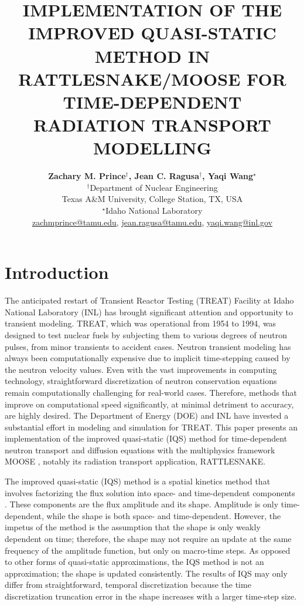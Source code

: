 \documentclass[12pt]{article}
\title{IMPLEMENTATION OF THE IMPROVED QUASI-STATIC METHOD IN RATTLESNAKE/MOOSE FOR TIME-DEPENDENT RADIATION TRANSPORT MODELLING}
\author{ 
  \textbf{Zachary M. Prince$^\dagger$, Jean C. Ragusa$^\dagger$, Yaqi Wang$^\star$} \\
 $^\dagger$Department of Nuclear Engineering \\
  Texas A\&M University, College Station, TX, USA\\
  $^\star$Idaho National Laboratory\\
  \href{mailto:zachmprince@tamu.edu}{zachmprince@tamu.edu}, \href{jean.ragusa@tamu.edu}{jean.ragusa@tamu.edu}, \href{yaqi.wang@inl.gov}{yaqi.wang@inl.gov} 
}
\begin{document}

\maketitle

%
\section{Introduction}
\label{sect::intro}

The anticipated restart of Transient Reactor Testing (TREAT) Facility at Idaho National Laboratory (INL) has brought significant attention and opportunity to transient modeling.  TREAT, which was operational from 1954 to 1994, was designed to test nuclear fuels by subjecting them to various degrees of neutron pulses, from minor transients to accident cases.  Neutron transient modeling has always been computationally expensive due to implicit time-stepping caused by the neutron velocity values. Even with the vast improvements in computing technology, straightforward discretization of neutron conservation equations remain computationally challenging for real-world cases.  Therefore, methods that improve on computational speed significantly, at minimal detriment to accuracy, are highly desired. The Department of Energy (DOE) and INL have invested a substantial effort in modeling and simulation for TREAT.  This paper presents an implementation of the improved quasi-static (IQS) method for time-dependent neutron transport and diffusion equations with the multiphysics framework MOOSE \cite{moose}, notably its radiation transport application, RATTLESNAKE.

The improved quasi-static (IQS) method is a spatial kinetics method that involves factorizing the flux solution into space- and time-dependent components \cite{Ott_1966,Dulla2008}.  These components are the flux amplitude and its shape. Amplitude is only time-dependent, while the shape is both space- and time-dependent.  However, the impetus of the method is the assumption that the shape is only weakly dependent on time; therefore, the shape may not require an update at the same frequency of the amplitude function, but only on macro-time steps. As opposed to other forms of quasi-static approximations, the IQS method is not an approximation; the shape is updated consistently.  The results of IQS may only differ from straightforward, temporal discretization because the time discretization truncation error in the shape increases with a larger time-step size. 
\end{document}
